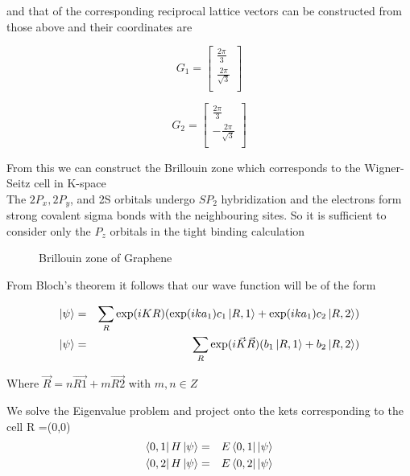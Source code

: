 \documentclass[a4paper]{article}
\begin{document}
and that of the corresponding reciprocal lattice vectors can be constructed from those above and their coordinates are \\
\begin{minipage}{0.5\textwidth}
\centering
\begin{equation*}
G_1 =
\begin{bmatrix}
    \frac{2\pi}{3} \\
    \frac{2\pi}{\sqrt{3}} \\
\end{bmatrix}
\end{equation*}


\end{minipage}
\begin{minipage}{0.5\textwidth}
\centering
\begin{equation*}
G_2 =
\begin{bmatrix}
    \frac{2\pi}{3} \\
    -\frac{2\pi}{\sqrt{3}} \\
\end{bmatrix}
\end{equation*}
\end{minipage}

From this we can construct the Brillouin zone which corresponds to the Wigner-Seitz cell in K-space\\

The $2P_{x}, 2P_{y}$, and 2S orbitals undergo $SP_{2}$ hybridization and the electrons form strong covalent sigma bonds with the neighbouring sites. So it is sufficient to consider only the $P_{z}$ orbitals in the tight binding calculation

\begin{figure}[h]
\centering
\caption{\label{bril}Brillouin zone of Graphene}
\end{figure}
From Bloch's theorem it follows that our wave function will be of the form

\begin{eqnarray}
    \ket{\psi}&=&\sum_{R}\exp(iKR)(\exp(ika_{1})c_{1}\ket{R,1} + \exp(ika_{1})c_{2}\ket{R,2} )\\
	\ket{\psi}&=&\sum_{R}\exp(i\vec{K}\vec{R})(b_{1}\ket{R,1} + b_{2}\ket{R,2} )
\end{eqnarray}


Where $\vec{R} = n\vec{R1} + m\vec{R2} $  with $m,n \in Z$


We solve the Eigenvalue problem and project onto the kets corresponding to the cell R =(0,0) 
\begin{eqnarray}
\bra{0,1}H\ket{\psi}&=&E\bra{0,1}\ket{\psi}\\
\bra{0,2}H\ket{\psi}&=&E\bra{0,2}\ket{\psi}
\end{eqnarray}
\end{document}
